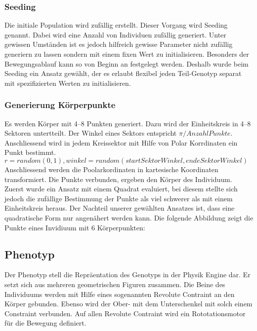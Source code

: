         \subsubsection{Seeding\label{subsub:GenotypeSeeding}}

          Die initiale Population wird zufällig erstellt. Dieser Vorgang wird Seeding genannt.
          Dabei wird eine Anzahl von Individuen zufällig generiert.
          Unter gewissen Umständen ist es jedoch hilfreich gewisse Parameter nicht zufällig generiern zu lassen
          sondern mit einem fixen Wert zu initialisieren.
          Besonders der Bewegungsablauf kann so von Beginn an festgelegt werden.
          Deshalb wurde beim Seeding ein Ansatz gewählt, der es erlaubt flexibel jeden Teil-Genotyp separat mit
          spezifizierten Werten zu initialisieren.

      \subsubsection{Generierung Körperpunkte\label{subsub:GenotypGenerierungKörperpunkte}}
        Es werden Körper mit 4--8 Punkten generiert. Dazu wird der Einheitskreis in 4--8 Sektoren untertteilt.
        Der Winkel eines Sektors entspricht \(\pi / Anzahl Punkte\). \\
        Anschliessend wird in jedem Kreissektor mit Hilfe von Polar Korrdinaten ein Punkt bestimmt. \\
        \( r = random (0, 1), winkel = random(startSektorWinkel, endeSektorWinkel ) \)
        Anschliessend werden die Poolarkordinaten in kartesische Koordinaten transformiert.
        Die Punkte verbunden, ergeben den Körper des Individuum. \\
        Zuerst wurde ein Ansatz mit einem Quadrat evaluiert, bei diesem stellte sich jedoch die zufällige Bestimmung
        der Punkte als viel schwerer als mit einem Einheitskreis heraus. Der Nachteil unserer gewählten
        Ansatzes ist, dass eine quadratische Form nur angenähert werden kann.
        Die folgende Abbildung zeigt die Punkte eines Invidiuum mit 6 Körperpunkten: \\

        


  \subsection{Phenotyp\label{sub:Phenotyp}}
    Der Phenotyp stell die Repräentation des Genotyps in der Physik Engine dar.
    Er setzt sich aus mehreren geometrischen Figuren zusammen. Die Beine des Individuums
    werden mit Hilfe eines sogenannten Revolute Contraint an den Körper gebunden.
    Ebenso wird der Ober- mit dem Unterschenkel mit solch einem Constraint verbunden.
    Auf allen Revolute Contraint wird ein Rototationsmotor für die Bewegung definiert.

